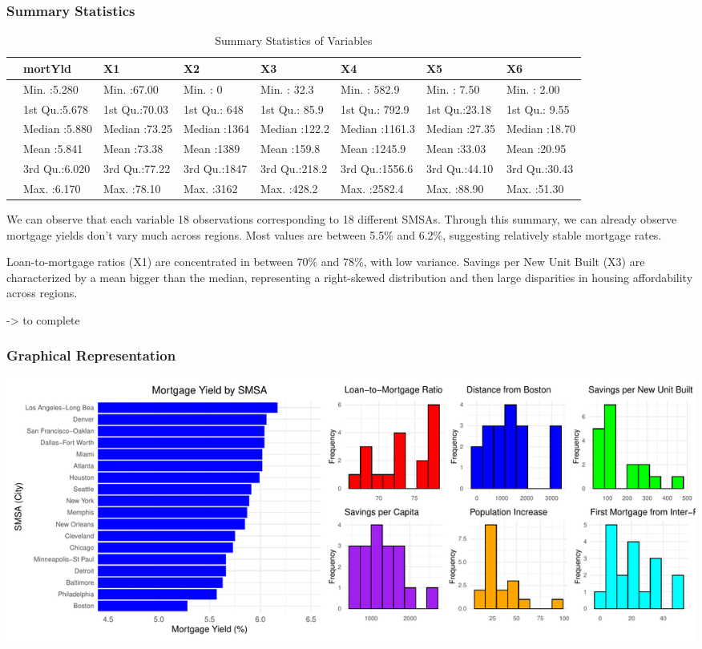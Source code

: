 \documentclass[
  11pt,
]{article}
\begin{document}
\subsubsection{Summary Statistics}\label{summary-statistics}

\begin{longtable}[t]{llllllll}
\caption{\label{tab:unnamed-chunk-3}Summary Statistics of Variables}\\
\toprule
 & mortYld & X1 & X2 & X3 & X4 & X5 & X6\\
\midrule
 & Min.   :5.280 & Min.   :67.00 & Min.   :   0 & Min.   : 32.3 & Min.   : 582.9 & Min.   : 7.50 & Min.   : 2.00\\
 & 1st Qu.:5.678 & 1st Qu.:70.03 & 1st Qu.: 648 & 1st Qu.: 85.9 & 1st Qu.: 792.9 & 1st Qu.:23.18 & 1st Qu.: 9.55\\
 & Median :5.880 & Median :73.25 & Median :1364 & Median :122.2 & Median :1161.3 & Median :27.35 & Median :18.70\\
 & Mean   :5.841 & Mean   :73.38 & Mean   :1389 & Mean   :159.8 & Mean   :1245.9 & Mean   :33.03 & Mean   :20.95\\
 & 3rd Qu.:6.020 & 3rd Qu.:77.22 & 3rd Qu.:1847 & 3rd Qu.:218.2 & 3rd Qu.:1556.6 & 3rd Qu.:44.10 & 3rd Qu.:30.43\\
\addlinespace
 & Max.   :6.170 & Max.   :78.10 & Max.   :3162 & Max.   :428.2 & Max.   :2582.4 & Max.   :88.90 & Max.   :51.30\\
\bottomrule
\end{longtable}

We can observe that each variable 18 observations corresponding to 18
different SMSAs. Through this summary, we can already observe mortgage
yields don't vary much across regions. Most values are between 5.5\% and
6.2\%, suggesting relatively stable mortgage rates.

Loan-to-mortgage ratios (X1) are concentrated in between 70\% and 78\%,
with low variance. Savings per New Unit Built (X3) are characterized by
a mean bigger than the median, representing a right-skewed distribution
and then large disparities in housing affordability across regions.

-\textgreater{} to complete

\subsubsection{Graphical Representation}\label{graphical-representation}

\includegraphics{Figs/unnamed-chunk-4-1.pdf}
\end{document}
